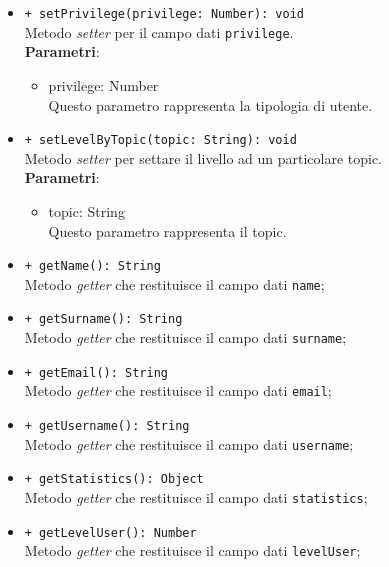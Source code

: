 \begin{itemize}
\begin{itemize}
				\item \texttt{+ setPrivilege(privilege: Number): void} \\
				Metodo \textit{setter} per il campo dati \texttt{privilege}.\\
				\textbf{Parametri}:
				\begin{itemize}
					\item {privilege: Number}\\
					Questo parametro rappresenta la tipologia di utente.
				\end{itemize}
				
				\item \texttt{+ setLevelByTopic(topic: String): void} \\
				Metodo \textit{setter} per settare il livello ad un particolare topic.\\
				\textbf{Parametri}:
				\begin{itemize}
					\item {topic: String}\\
					Questo parametro rappresenta il topic.
				\end{itemize}
				
				\item \texttt{+ getName(): String} \\
				Metodo \textit{getter} che restituisce il campo dati \texttt{name};
				
				\item \texttt{+ getSurname(): String} \\
				Metodo \textit{getter} che restituisce il campo dati \texttt{surname};
				
				\item \texttt{+ getEmail(): String} \\
				Metodo \textit{getter} che restituisce il campo dati \texttt{email};
				
				\item \texttt{+ getUsername(): String} \\
				Metodo \textit{getter} che restituisce il campo dati \texttt{username};
				
				\item \texttt{+ getStatistics(): Object} \\
				Metodo \textit{getter} che restituisce il campo dati \texttt{statistics};
				
				\item \texttt{+ getLevelUser(): Number} \\
				Metodo \textit{getter} che restituisce il campo dati \texttt{levelUser};
				

\end{itemize}
\end{itemize}
